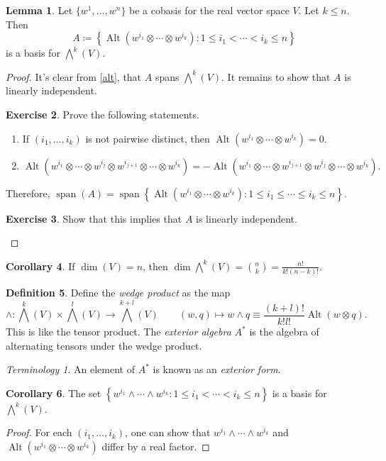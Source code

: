 \documentclass[10pt,letterpaper,cm]{nupset}
\theoremstyle{definition}
\newtheorem{definition}{Definition}[subsection]
\theoremstyle{theorem}
\newtheorem{lemma}[definition]{Lemma}
\newtheorem{corollary}[definition]{Corollary}
\newtheorem{exercise}[definition]{Exercise}
\theoremstyle{remark}
\newtheorem*{term}{Terminology}
\newcommand{\1}{\mathbf{1}}
\newcommand{\0}{\vec 0}
\DeclareMathOperator*{\Span}{span}
\DeclareMathOperator{\Alt}{Alt}
\begin{document}
\begin{lemma}
Let $\{w^1, \ldots, w^n\}$ be a cobasis for the real vector space $V$. Let $k\leq n$. Then $$A\coloneqq   \left\{\Alt(w^{i_1} \otimes \cdots \otimes w^{i_k}) : 1 \leq i_1 < \cdots < i_k \leq n \right\} $$ is a basis for $\bigwedge^k(V)$.
\end{lemma}
\begin{proof}
It's clear from \cref{alt}, that $A$ spans $\bigwedge^k(V)$. It remains to show that $A$ is linearly independent. 
\begin{exercise} Prove the following statements. 
\begin{enumerate}
\item If $(i_1, \ldots, i_k)$ is not pairwise distinct, then $\Alt(w^{i_1} \otimes \cdots \otimes w^{i_k}) = 0$.
\item $\Alt(w^{i_1} \otimes \cdots \otimes w^{i_j} \otimes w^{i_{j+1}} \otimes \cdots \otimes w^{i_k}) = -\Alt(w^{i_1} \otimes \cdots \otimes w^{i_{j+1}} \otimes w^{i_{j}} \otimes \cdots \otimes w^{i_k}).$
\end{enumerate}
\end{exercise}
Therefore, $\Span(A) = \Span{\left\{\Alt(w^{i_1} \otimes \cdots \otimes w^{i_k}) : 1 \leq i_1 \leq \cdots \leq i_k \leq n\right \}}$.
\begin{exercise}
Show that this implies that $A$ is linearly independent.
\end{exercise}
\end{proof}

\begin{corollary}
If $\dim(V) = n$, then $\dim \bigwedge^k(V) = {n\choose k} = \frac{n!}{k!(n-k)!}$.
\end{corollary}

\begin{definition}\label{WP}
Define the \textit{wedge product} as the map $$\wedge : \bigwedge^k(V) \times \bigwedge^l(V) \to \bigwedge^{k+l}(V) \quad \quad (w, q) \mapsto w \wedge q \equiv  \frac{(k+l)!}{k! l!}\Alt(w\otimes q).$$  This is like the tensor product. The \textit{exterior algebra} $A^{\ast}$ is the algebra of alternating tensors under the wedge product.
\end{definition}

\begin{term}
An element of $A^{\ast}$ is known as an \textit{exterior form}.
\end{term}

\begin{corollary}
The set $\left\{w^{i_1} \wedge \cdots \wedge w^{i_k}  : 1 \leq i_1 < \cdots < i_k \leq n\right\}$ is a basis for $\bigwedge^k(V)$.
\end{corollary}
\begin{proof}
For each $(i_1, \ldots, i_k)$, one can show that $w^{i_1} \wedge \cdots \wedge w^{i_k}$ and $\Alt(w^{i_1} \otimes \cdots \otimes w^{i_k} )$ differ by a real factor.
\end{proof}
\end{document}
